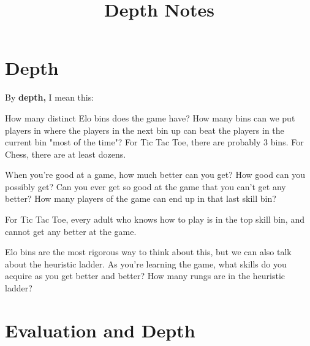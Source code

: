 \documentclass[12pt]{article}
\begin{document}
\title{Depth Notes}

\maketitle

\section{Depth}

By {\bf depth,} I mean this:

How many distinct Elo bins does the game have?  How many bins can we put players in where the players in the next bin up can beat the players in the current bin "most of the time"?  For Tic Tac Toe, there are probably 3 bins.  For Chess, there are at least dozens.

When you're good at a game, how much better can you get?  How good can you possibly get?  Can you ever get so good at the game that you can't get any better?  How many players of the game can end up in that last skill bin?

For Tic Tac Toe, every adult who knows how to play is in the top skill bin, and cannot get any better at the game.

Elo bins are the most rigorous way to think about this, but we can also talk about the heuristic ladder.  As you're learning the game, what skills do you acquire as you get better and better?  How many rungs are in the heuristic ladder?


\section{Evaluation and Depth}
\end{document}
